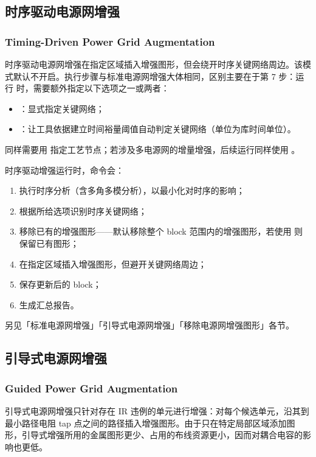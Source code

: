 \subsection{时序驱动电源网增强}
\subsubsection*{Timing-Driven Power Grid Augmentation}

时序驱动电源网增强在指定区域插入增强图形，但会绕开时序关键网络周边。该模式默认不开启。执行步骤与标准电源网增强大体相同，区别主要在于第 7 步：运行  时，需要额外指定以下选项之一或两者：
\begin{itemize}
  \item {}：显式指定关键网络；
  \item {}：让工具依据建立时间裕量阈值自动判定关键网络（单位为库时间单位）。
\end{itemize}
同样需要用  指定工艺节点；若涉及多电源网的增量增强，后续运行同样使用 。

时序驱动增强运行时，命令会：
\begin{enumerate}
  \item 执行时序分析（含多角多模分析），以最小化对时序的影响；
  \item 根据所给选项识别时序关键网络；
  \item 移除已有的增强图形——默认移除整个 block 范围内的增强图形，若使用  则保留已有图形；
  \item 在指定区域插入增强图形，但避开关键网络周边；
  \item 保存更新后的 block；
  \item 生成汇总报告。
\end{enumerate}

\begin{seeAlsoBox}
另见「标准电源网增强」「引导式电源网增强」「移除电源网增强图形」各节。
\end{seeAlsoBox}

\subsection{引导式电源网增强}
\subsubsection*{Guided Power Grid Augmentation}

引导式电源网增强只针对存在 IR 违例的单元进行增强：对每个候选单元，沿其到最小路径电阻 tap 点之间的路径插入增强图形。由于只在特定局部区域添加图形，引导式增强所用的金属图形更少、占用的布线资源更小，因而对耦合电容的影响也更低。

